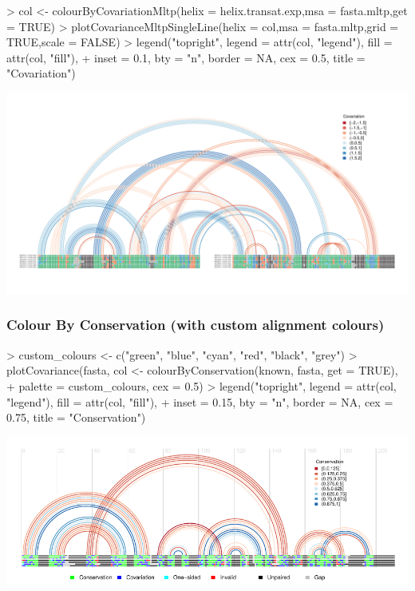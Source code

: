 \documentclass[letterpaper]{article}
\begin{document}
\begin{Schunk}
\begin{Sinput}
> col <- colourByCovariationMltp(helix = helix.transat.exp,msa = fasta.mltp,get = TRUE)
> plotCovarianceMltpSingleLine(helix = col,msa = fasta.mltp,grid = TRUE,scale = FALSE)
> legend("topright", legend = attr(col, "legend"), fill = attr(col, "fill"),
+        inset = 0.1, bty = "n", border = NA, cex = 0.5, title = "Covariation")
\end{Sinput}
\end{Schunk}
\includegraphics{R4RNA-026}


\subsubsection{Colour By Conservation (with custom alignment colours)}

\begin{Schunk}
\begin{Sinput}
> custom_colours <- c("green", "blue", "cyan", "red", "black", "grey")
> plotCovariance(fasta, col <- colourByConservation(known, fasta, get = TRUE),
+     palette = custom_colours, cex = 0.5)
> legend("topright", legend = attr(col, "legend"), fill = attr(col, "fill"),
+     inset = 0.15, bty = "n", border = NA, cex = 0.75, title = "Conservation")
\end{Sinput}
\end{Schunk}
\includegraphics{R4RNA-027}
\end{document}

